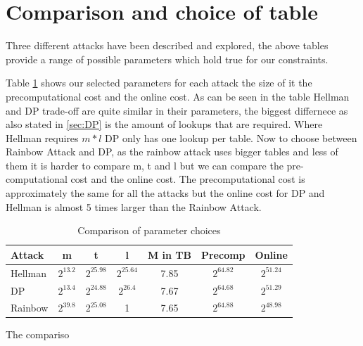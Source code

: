 \newpage
\section{Comparison and choice of table}
Three different attacks have been described and explored, the above tables provide a range of possible parameters which hold true for our constraints.

Table \ref{tab:compare} shows our selected parameters for each attack the size of it the precomputational cost and the online cost. As can be seen in the table Hellman and DP trade-off are quite similar in their parameters, the biggest differnece as also stated in \ref{sec:DP} is the amount of lookups that are required.
Where Hellman requires $m*l$ DP only has one lookup per table.
Now to choose between Rainbow Attack and DP, as the rainbow attack uses bigger tables and less of them it is harder to compare m, t and l but we can compare the pre-computational cost and the online cost.
The precomputational cost is approximately the same for all the attacks but the
online cost for DP and Hellman is almost 5 times larger than the Rainbow Attack.

\begin{table}[h]
\centering
\begin{tabular}{|l|cccccc}
\hline
\rowcolor[HTML]{EFEFEF}
Attack  & \multicolumn{1}{c|}{\cellcolor[HTML]{EFEFEF}m} & \multicolumn{1}{c|}{\cellcolor[HTML]{EFEFEF}t} & \multicolumn{1}{c|}{\cellcolor[HTML]{EFEFEF}l} & \multicolumn{1}{c|}{\cellcolor[HTML]{EFEFEF}M in TB} & \multicolumn{1}{c|}{\cellcolor[HTML]{EFEFEF}Precomp} & \multicolumn{1}{c|}{\cellcolor[HTML]{EFEFEF}Online} \\ \hline
Hellman & $2^{13.2}$                                     & $2^{25.98}$                                    & $2^{25.64}$                                    & 7.85                                                 & $2^{64.82}$                                          & $2^{51.24}$                                         \\ \cline{1-1}
\rowcolor[HTML]{EFEFEF}
DP      & $2^{13.4}$                                     & $2^{24.88}$                                    & $2^{26.4}$                                     & 7.67                                                 & $2^{64.68}$                                          & $2^{51.29}$                                         \\
Rainbow & $2^{39.8}$                                     & $2^{25.08}$                                    & 1                                              & 7.65                                                 & $2^{64.88}$                                          & $2^{48.98}$                                         \\ \cline{1-1}
\end{tabular}
\caption{Comparison of parameter choices}
\label{tab:compare}
\end{table}
The compariso

